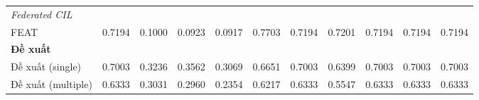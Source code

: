 \begin{table}[H]
{\begin{tabular}{lcccccccccc}
        \hline
        \multicolumn{11}{l}{\textit{Federated CIL}} \\
        FEAT & \cellcolor{green!60!black}0.7194 & 0.1000 & 0.0923 & 0.0917 & \cellcolor{green!60!black}0.7703 & \cellcolor{green!60!black}0.7194 & \cellcolor{green!60!black}0.7201 & \cellcolor{green!60!black}0.7194 & \cellcolor{green!60!black}0.7194 & \cellcolor{green!60!black}0.7194 \\
        \hline
        \multicolumn{11}{l}{\textbf{Đề xuất}} \\
        Đề xuất (single) & 0.7003 & \cellcolor{green!60!black}0.3236 & \cellcolor{green!60!black}0.3562 & \cellcolor{green!60!black}0.3069 & \cellcolor{green!90!black}0.6651 & 0.7003 & \cellcolor{green!90!black}0.6399 & 0.7003 & 0.7003 & 0.7003 \\
        Đề xuất (multiple) & 0.6333 & \cellcolor{green!90!black}0.3031 & 0.2960 & 0.2354 & 0.6217 & 0.6333 & 0.5547 & 0.6333 & 0.6333 & 0.6333 \\
        \hline
    \end{tabular}}
\end{table}

